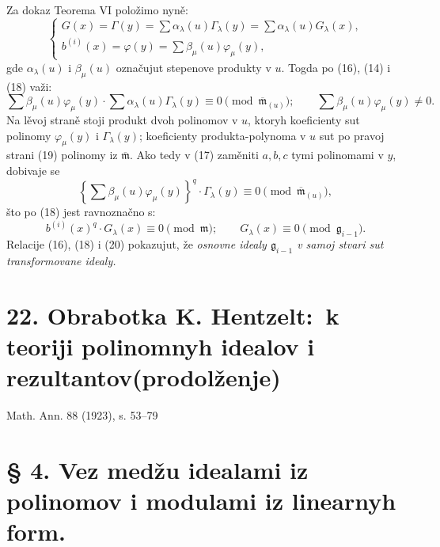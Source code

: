 \documentclass[11pt]{article}
\providecommand{\mideal}{\mathfrak m}
\providecommand{\gideal}{\mathfrak g}
\providecommand{\zero}[1]{\equiv 0\pmod{#1}}
\begin{document}
Za dokaz Teorema VI položimo nyně:
\begin{equation}
\begin{cases}
 G(x)=\Gamma(y)=\sum \alpha_\lambda(u)\Gamma_\lambda(y)=\sum \alpha_\lambda(u)G_\lambda(x),\\
 b^{(i)}(x)=\varphi(y)=\sum \beta_\mu(u)\varphi_\mu(y),
\end{cases}
\tag{18}
\end{equation}
gde $\alpha_\lambda(u)$ i $\beta_\mu(u)$ označujut stepenove produkty v $u$. Togda po (16), (14) i (18) važi:
\begin{equation}
 \sum\beta_\mu(u)\varphi_\mu(y)\cdot
 \sum\alpha_\lambda(u)\Gamma_\lambda(y)\zero{\overline{\mideal}_{(u)}};
 \qquad
 \sum\beta_\mu(u)\varphi_\mu(y)\ne0.
\tag{19}
\end{equation}
Na lěvoj straně stoji produkt dvoh polinomov v $u$, ktoryh koeficienty sut polinomy $\varphi_\mu(y)$ i $\Gamma_\lambda(y)$; koeficienty produkta-polynoma v $u$ sut po pravoj strani (19) polinomy iz $\overline{\mideal}$. Ako tedy v (17) zaměniti $a,b,c$ tymi polinomami v $y$, dobivaje se
\[
 \left\{\sum\beta_\mu(u)\varphi_\mu(y)\right\}^q\cdot \Gamma_\lambda(y)\zero{\overline{\mideal}_{(u)}},
\]
što po (18) jest ravnoznačno s:
\begin{equation}
 b^{(i)}(x)^q\cdot G_\lambda(x)\zero{\mideal};
 \qquad
 G_\lambda(x)\zero{\gideal_{i-1}}.
\tag{20}
\end{equation}
Relacije (16), (18) i (20) pokazujut, že {\itshape osnovne idealy $\gideal_{i-1}$ v samoj stvari sut transformovane idealy.}

\section*{22. Obrabotka K. Hentzelt:\ k teoriji polinomnyh idealov i rezultantov\quad (prodolženje)}
\begin{center}
Math. Ann. 88 (1923), s. 53--79
\end{center}

\section*{§ 4. Vez medžu idealami iz polinomov i modulami iz linearnyh form.}
\end{document}

